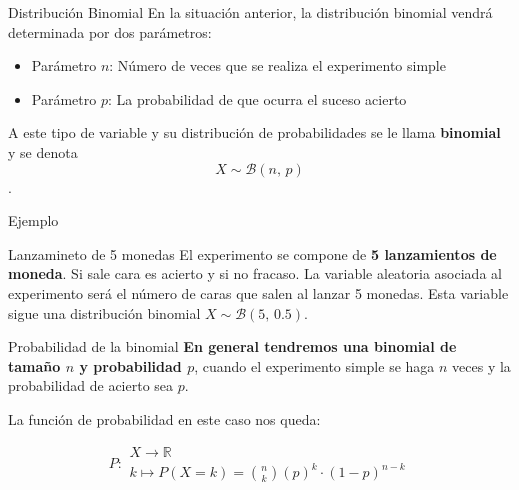 \documentclass[11pt,handout]{beamer}
\begin{document}
\begin{frame}{Distribución Binomial}
En la situación anterior, la distribución binomial vendrá determinada por dos parámetros:
\begin{itemize}[<+->]
\item Parámetro $n$: Número de veces que se realiza el experimento simple 
\item Parámetro $p$: La probabilidad de que ocurra el suceso acierto
\end{itemize}
\pause

A este tipo de variable y su distribución de probabilidades se le llama \textbf{binomial} y se denota $$X \sim \mathcal{B}(n,\,p)$$.
\end{frame}

\begin{frame}{Ejemplo}
\begin{block}{Lanzamineto de 5 monedas} El experimento se compone de \textbf{5 lanzamientos de moneda}. Si sale cara es acierto y si no fracaso. La variable aleatoria asociada al experimento será el número de caras que salen al lanzar 5 monedas. Esta variable sigue una distribución binomial $X \sim \mathcal{B}(5,\,0.5)$.
\end{block}



\end{frame}

\begin{frame}{Probabilidad de la binomial}
\textbf{En general tendremos una binomial de tamaño $n$ y probabilidad $p$}, cuando el experimento simple se haga $n$ veces y la probabilidad de acierto sea $p$.

La función de probabilidad en este caso nos queda:

\begin{block}{}
 $$P\colon \begin{array}{l} 
          X \rightarrow \mathbb{R} \\ 
          k\mapsto P(X=k)=\binom{n}{k}\left(p\right)^k\cdot  \left(1-p\right)^{n-k} 
         \end{array}$$

\end{block}

\end{frame}
\end{document}

